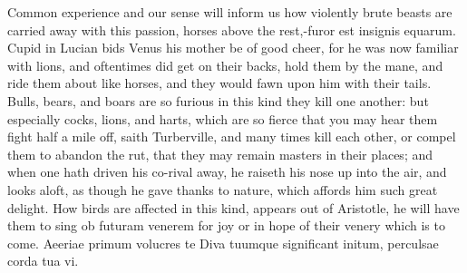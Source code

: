 {Common experience and our sense will inform us how violently brute
beasts are carried away with this passion, horses above the rest,-furor
est insignis equarum. Cupid in Lucian bids Venus his mother be of
good cheer, for he was now familiar with lions, and oftentimes did get
on their backs, hold them by the mane, and ride them about like horses,
and they would fawn upon him with their tails. Bulls, bears, and boars
are so furious in this kind they kill one another: but especially
cocks,  lions, and harts, which are so fierce that you may hear
them fight half a mile off, saith Turberville, and many times
kill each other, or compel them to abandon the rut, that they may
remain masters in their places; and when one hath driven his co-rival
away, he raiseth his nose up into the air, and looks aloft, as though
he gave thanks to nature, which affords him such great delight. How
birds are affected in this kind, appears out of Aristotle, he will have
them to sing ob futuram venerem for joy or in hope of their venery
which is to come.
Aeeriae primum volucres te Diva tuumque
significant initum, perculsae corda tua vi.

}
